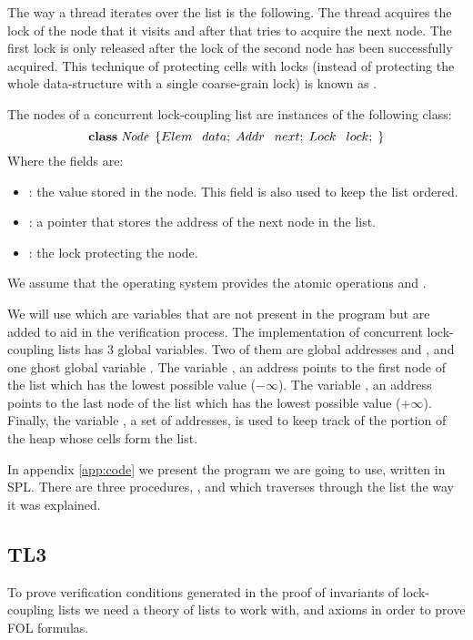 The way a thread iterates over the list is the following.
%
The thread acquires the lock of the node
that it visits and after that tries to acquire the next node.
The first lock is only released after the lock of the
second node has been successfully acquired.
%
This technique of protecting cells with locks (instead of protecting
the whole data-structure with a single coarse-grain lock) is known as
.


The nodes of a concurrent lock-coupling list are instances of the following 
\ListNode class:
%
\[
	  \textbf{class} \;\mathit{Node}  \;\left\{
				Elem \:\;\; data; \;
				Addr \:\;\; next; \;
				Lock \:\;\; lock; \;
		\right\}
\]
%
Where the fields are:
\begin{itemize}
		\item \fData: the value stored in the node. This field is also used to keep 
			the list ordered.
		\item \fNext: a pointer that stores the address of the next node in 
			the list.
		\item \fLock: the lock protecting the node.
\end{itemize}

We assume that the operating system provides the atomic operations \fLock 
and \fUnlock. 

We will use  which are variables that are not present in the program but are added to aid in the verification process.
%
The implementation of concurrent lock-coupling lists has 3 global variables.
%
Two of them are global addresses \head and \tail, and one ghost global variable \region.
The variable \head, an address points to the first node of the list which has the lowest possible value ($-\infty$).
%
The variable \tail, an address points to the last node of the list  which has the lowest possible value ($+\infty$).
%
Finally, the variable \region, a set of addresses, is used to keep track of the portion of the heap whose cells form the list.



In appendix \ref{app:code} we present the program we are going to use, written in \gls{SPL}. 
%
There are three procedures, \Search, \Insert and \Remove which traverses through the list the way it was explained.



\subsection{TL3}
To prove verification conditions generated in the proof of invariants of lock-coupling lists we need a theory of lists to work with, and axioms in order to prove \gls{FOL} formulas.

